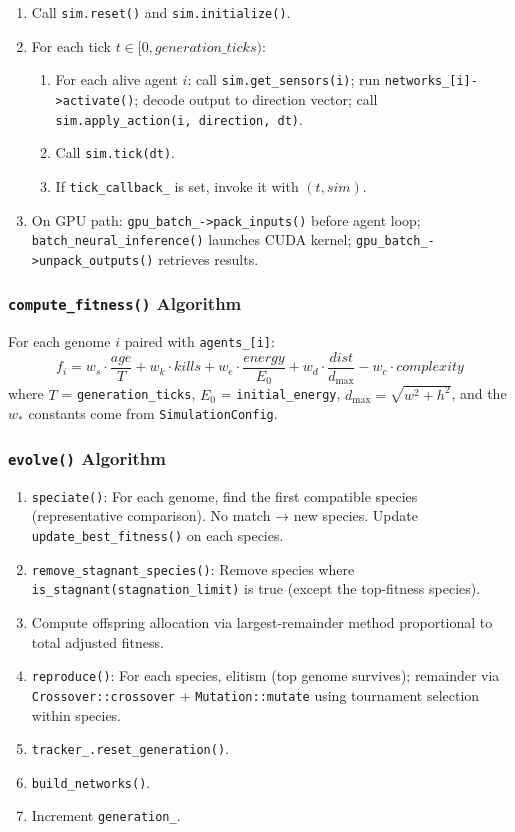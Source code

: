 \begin{enumerate}[nosep]
  \item Call \texttt{sim.reset()} and \texttt{sim.initialize()}.
  \item For each tick $t \in [0, \mathit{generation\_ticks})$:
    \begin{enumerate}[nosep,label=\alph*.]
      \item For each alive agent $i$: call \texttt{sim.get\_sensors(i)};
        run \texttt{networks\_[i]->activate()}; decode output to direction vector;
        call \texttt{sim.apply\_action(i, direction, dt)}.
      \item Call \texttt{sim.tick(dt)}.
      \item If \texttt{tick\_callback\_} is set, invoke it with $(t, \mathit{sim})$.
    \end{enumerate}
  \item On GPU path: \texttt{gpu\_batch\_->pack\_inputs()} before agent loop;
    \texttt{batch\_neural\_inference()} launches CUDA kernel;
    \texttt{gpu\_batch\_->unpack\_outputs()} retrieves results.
\end{enumerate}

\subsubsection{\texttt{compute\_fitness()} Algorithm}

For each genome $i$ paired with \texttt{agents\_[i]}:
\[
  f_i = w_s \cdot \frac{\mathit{age}}{T} + w_k \cdot \mathit{kills} + w_e \cdot \frac{\mathit{energy}}{E_0}
        + w_d \cdot \frac{\mathit{dist}}{d_{\max}} - w_c \cdot \mathit{complexity}
\]
where $T$ = \texttt{generation\_ticks}, $E_0$ = \texttt{initial\_energy},
$d_{\max} = \sqrt{w^2+h^2}$, and the $w_*$ constants come from
\texttt{SimulationConfig}.

\subsubsection{\texttt{evolve()} Algorithm}
\begin{enumerate}[nosep]
  \item \texttt{speciate()}: For each genome, find the first compatible species
    (representative comparison).  No match → new species.  Update
    \texttt{update\_best\_fitness()} on each species.
  \item \texttt{remove\_stagnant\_species()}: Remove species where
    \texttt{is\_stagnant(stagnation\_limit)} is true (except the top-fitness species).
  \item Compute offspring allocation via largest-remainder method proportional to
    total adjusted fitness.
  \item \texttt{reproduce()}: For each species, elitism (top genome survives);
    remainder via \texttt{Crossover::crossover} + \texttt{Mutation::mutate} using
    tournament selection within species.
  \item \texttt{tracker\_.reset\_generation()}.
  \item \texttt{build\_networks()}.
  \item Increment \texttt{generation\_}.
\end{enumerate}

